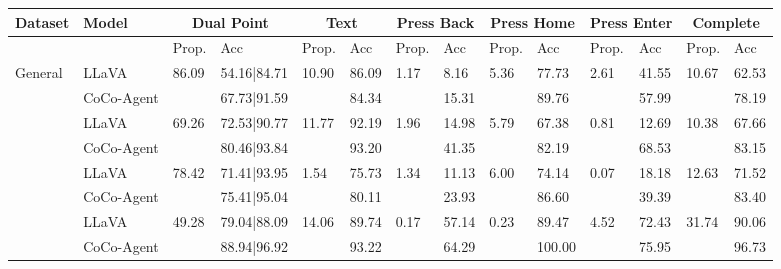 \begin{table*}[htb]
	\centering\small
        \setlength{\abovecaptionskip}{0.2cm}
        \setlength{\belowcaptionskip}{-0.2cm}
        \begin{tabular}{p{1.4cm}p{1.7cm}p{0.5cm}p{1.3cm}p{0.4cm}p{0.4cm}p{0.4cm}p{0.4cm}p{0.3cm}p{0.4cm}p{0.3cm}p{0.4cm}p{0.4cm}p{0.5cm}}
		\toprule
		\textbf{Dataset} & \textbf{Model} &\multicolumn{2}{c}{\textbf{Dual Point}} & \multicolumn{2}{c}{\textbf{Text}} & \multicolumn{2}{c}{\textbf{Press Back}} & \multicolumn{2}{c}{\textbf{Press Home}} & \multicolumn{2}{c}{\textbf{Press Enter}} & \multicolumn{2}{c}{\textbf{Complete}} \\
            \midrule
            &  & Prop. &Acc& Prop. &Acc & Prop. &Acc & Prop. &Acc & Prop. &Acc & Prop. &Acc \\
            \midrule
            \multirow{2}{*}{General} & LLaVA  & \multirow{2}{*}{86.09}&54.16|84.71 & \multirow{2}{*}{10.90} &86.09 & \multirow{2}{*}{1.17}&8.16 & \multirow{2}{*}{5.36}&77.73 &  \multirow{2}{*}{2.61} &41.55 & \multirow{2}{*}{10.67} &62.53 \\
            & CoCo-Agent  &  &67.73|91.59 & & 84.34 & &15.31 & &89.76 &&57.99 & &78.19 \\
            \hdashline
            \multirow{2}{*}{Install} & LLaVA  & \multirow{2}{*}{69.26}& 72.53|90.77 &\multirow{2}{*}{11.77}  & 92.19 & \multirow{2}{*}{1.96} &14.98 & \multirow{2}{*}{5.79} & 67.38 &\multirow{2}{*}{0.81} & 12.69  &  \multirow{2}{*}{10.38}& 67.66  \\
            & CoCo-Agent  & & 80.46|93.84 & & 93.20 & & 41.35 & & 82.19& &  68.53 & & 83.15 \\
            \hdashline
            \multirow{2}{*}{GoogleApps} & LLaVA & \multirow{2}{*}{78.42}& 71.41|93.95 & \multirow{2}{*}{1.54} & 75.73 & \multirow{2}{*}{1.34} & 11.13 &\multirow{2}{*}{6.00} & 74.14 & \multirow{2}{*}{0.07} & 18.18  & \multirow{2}{*}{12.63} & 71.52 \\
            & CoCo-Agent & &75.41|95.04 & &80.11  & & 23.93 & & 86.60 & & 39.39 & & 83.40  \\
            \hdashline
            \multirow{2}{*}{Single} & LLaVA & \multirow{2}{*}{49.28} & 79.04|88.09 &\multirow{2}{*}{14.06} &89.74 & \multirow{2}{*}{0.17} & 57.14 & \multirow{2}{*}{0.23} & 89.47 & \multirow{2}{*}{4.52} & 72.43 & \multirow{2}{*}{31.74} & 90.06  \\
            & CoCo-Agent & & 88.94|96.92 & & 93.22 & &64.29 & & 100.00 & & 75.95  & &96.73\\

\end{tabular}
\end{table*}
